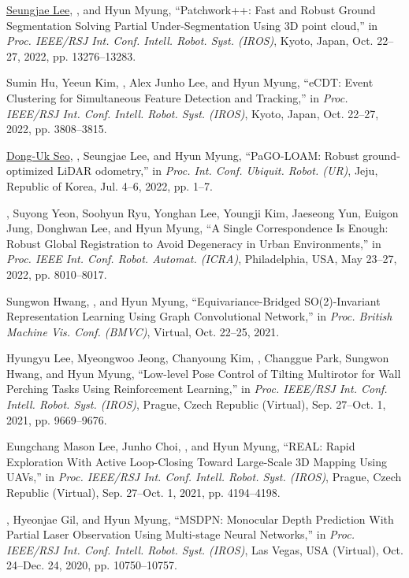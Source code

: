 \begin{pubSubsectionNum}
    \item \underline{Seungjae Lee}, \underline{\hyungtaelim}, and Hyun Myung, ``Patchwork++: Fast and Robust Ground Segmentation Solving Partial Under-Segmentation Using 3D point cloud,'' in \textit{Proc. IEEE/RSJ Int. Conf. Intell. Robot. Syst. (IROS)}, Kyoto, Japan, Oct. 22--27, 2022, pp. 13276--13283.
    \item Sumin Hu, Yeeun Kim, \hyungtaelim, Alex Junho Lee, and Hyun Myung, ``eCDT: Event Clustering for Simultaneous Feature Detection and Tracking,'' in \textit{Proc. IEEE/RSJ Int. Conf. Intell. Robot. Syst. (IROS)}, Kyoto, Japan, Oct. 22--27, 2022, pp. 3808--3815.
    \item \underline{Dong-Uk Seo}, \underline{\hyungtaelim}, Seungjae Lee, and Hyun Myung, ``PaGO-LOAM: Robust ground- optimized LiDAR odometry,'' in \textit{Proc. Int. Conf. Ubiquit. Robot. (UR)}, Jeju, Republic of Korea, Jul. 4--6, 2022, pp. 1--7.
    \item \hyungtaelim, Suyong Yeon, Soohyun Ryu, Yonghan Lee, Youngji Kim, Jaeseong Yun, Euigon Jung, Donghwan Lee, and Hyun Myung, ``A Single Correspondence Is Enough: Robust Global Registration to Avoid Degeneracy in Urban Environments,'' in \textit{Proc. IEEE Int. Conf. Robot. Automat. (ICRA)}, Philadelphia, USA, May 23--27, 2022, pp. 8010--8017.
    \item Sungwon Hwang, \hyungtaelim, and Hyun Myung, ``Equivariance-Bridged SO(2)-Invariant Representation Learning Using Graph Convolutional Network,'' in \textit{Proc. British Machine Vis. Conf. (BMVC)}, Virtual, Oct. 22--25, 2021.
    \item Hyungyu Lee, Myeongwoo Jeong, Chanyoung Kim, \hyungtaelim, Changgue Park, Sungwon Hwang, and Hyun Myung, ``Low-level Pose Control of Tilting Multirotor for Wall Perching Tasks Using Reinforcement Learning,'' in \textit{Proc. IEEE/RSJ Int. Conf. Intell. Robot. Syst. (IROS)}, Prague, Czech Republic (Virtual), Sep. 27--Oct. 1, 2021, pp. 9669--9676.
    \item Eungchang Mason Lee, Junho Choi, \hyungtaelim, and Hyun Myung, ``REAL: Rapid Exploration With Active Loop-Closing Toward Large-Scale 3D Mapping Using UAVs,'' in \textit{Proc. IEEE/RSJ Int. Conf. Intell. Robot. Syst. (IROS)}, Prague, Czech Republic (Virtual), Sep. 27--Oct. 1, 2021, pp. 4194--4198.
    \item \hyungtaelim, Hyeonjae Gil, and Hyun Myung, ``MSDPN: Monocular Depth Prediction With Partial Laser Observation Using Multi-stage Neural Networks,'' in \textit{Proc. IEEE/RSJ Int. Conf. Intell. Robot. Syst. (IROS)}, Las Vegas, USA (Virtual), Oct. 24--Dec. 24, 2020, pp. 10750--10757.

\end{pubSubsectionNum}
